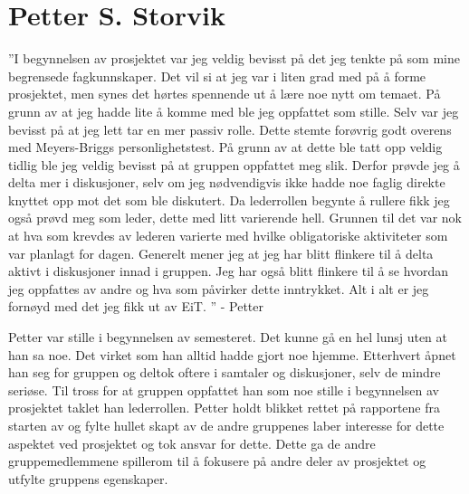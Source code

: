 \section{Petter S. Storvik}
''I begynnelsen av prosjektet var jeg veldig bevisst på det jeg tenkte på som mine begrensede fagkunnskaper. 
Det vil si at jeg var i liten grad med på å forme prosjektet, men synes det hørtes spennende ut å lære noe nytt om temaet. 
På grunn av at jeg hadde lite å komme med ble jeg oppfattet som stille. 
Selv var jeg bevisst på at jeg lett tar en mer passiv rolle. 
Dette stemte forøvrig godt overens med Meyers-Briggs personlighetstest. 
På grunn av at dette ble tatt opp veldig tidlig ble jeg veldig bevisst på at gruppen oppfattet meg slik. 
Derfor prøvde jeg å delta mer i diskusjoner, selv om jeg nødvendigvis ikke hadde noe faglig direkte knyttet opp mot det som ble diskutert. 
Da lederrollen begynte å rullere fikk jeg også prøvd meg som leder, dette med litt varierende hell. 
Grunnen til det var nok at hva som krevdes av lederen varierte med hvilke obligatoriske aktiviteter som var planlagt for dagen. 
Generelt mener jeg at jeg har blitt flinkere til å delta aktivt i diskusjoner innad i gruppen. 
Jeg har også blitt flinkere til å se hvordan jeg oppfattes av andre og hva som påvirker dette inntrykket. 
Alt i alt er jeg fornøyd med det jeg fikk ut av EiT. '' \hfill - Petter
\vspace{\secspace}

Petter var stille i begynnelsen av semesteret.
Det kunne gå en hel lunsj uten at han sa noe.
Det virket som han alltid hadde gjort noe hjemme.
Etterhvert åpnet han seg for gruppen og deltok oftere i samtaler og diskusjoner, selv de mindre seriøse.
Til tross for at gruppen oppfattet han som noe stille i begynnelsen av prosjektet taklet han lederrollen.
Petter holdt blikket rettet på rapportene fra starten av og fylte hullet skapt av de andre gruppenes laber interesse for dette aspektet ved prosjektet og tok ansvar for dette.
Dette ga de andre gruppemedlemmene spillerom til å fokusere på andre deler av prosjektet og utfylte gruppens egenskaper.

